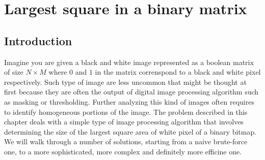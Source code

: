 %

\chapter{Largest square in a binary matrix}
\label{ch:square_in_matrix}
\section*{Introduction}
Imagine you are given a black and white image represented as a boolean matrix of size $N\times M$
where $0$ and $1$ in the matrix correnspond to a black and white pixel respectively. Such type of
image are less uncommon that might be thought at first because they are often the output of digital
image processing algorithm such as masking or thresholding. Further analyzing this kind of images
often requires to identify homogeneous portions of the image. The problem described in this chapter
deals with a simple type of image processing algorithm that involves determining the size of the
largest square area of white pixel of a binary bitmap. We will walk through a number of solutions,
starting from a naive brute-force one, to a more sophisticated, more complex and definitely more
efficine one.
 

